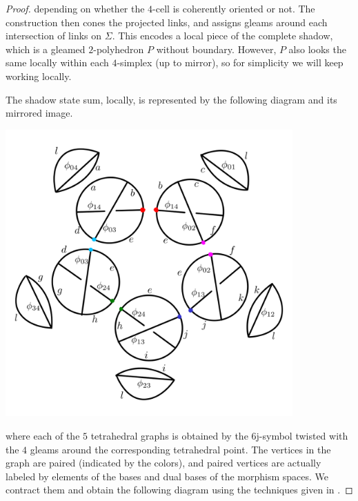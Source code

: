 \documentclass[12pt]{extarticle}
\numberwithin{equation}{section} %
\theoremstyle{mystyle}
\begin{document}
\begin{proof}
  \noindent depending on whether the $4$-cell is coherently
  oriented or not. The construction then cones the projected
  links, and assigns gleams around each intersection of links on
  $\Sigma$. This encodes a local piece of the complete shadow,
  which is a gleamed $2$-polyhedron $P$ without boundary.
  However, $P$ also looks the same locally within each
  $4$-simplex (up to mirror), so for simplicity we will keep
  working locally.

  The shadow state sum, locally, is represented by the following
  diagram and its mirrored image.

  \begin{center}
    \includegraphics[height=11cm]{main-shadow-state-sum-1}
  \end{center}

  \noindent where each of the $5$ tetrahedral graphs is obtained
  by the $6$j-symbol twisted with the $4$ gleams around the
  corresponding tetrahedral point. The vertices in the graph are
  paired (indicated by the colors), and paired vertices are
  actually labeled by elements of the bases and dual bases of the
  morphism spaces. We contract them and obtain the following
  diagram using the techniques given in
  \cite[Lemma 1.1, 1.3]{kirillov-balsam/turaev-viro-I}.


\end{proof}
\end{document}

